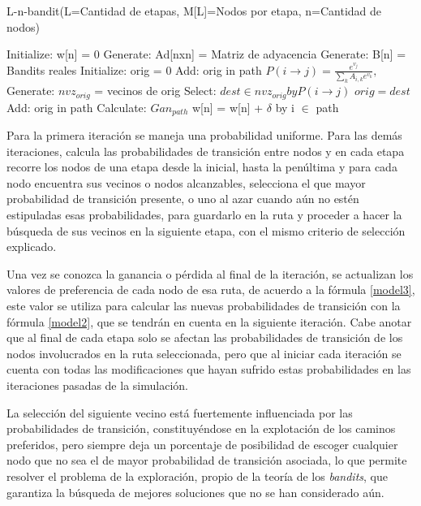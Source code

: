 \begin{algorithm}
\caption{L-n-bandit(L=Cantidad de etapas, M[L]=Nodos por etapa, n=Cantidad de nodos)} 
\label{Pseudo}
\begin{algorithmic}[1]
\STATE Initialize: w[n] = 0
\STATE Generate: Ad[nxn] = Matriz de adyacencia
\STATE Generate: B[n] = Bandits reales
     \STATE Initialize: orig = 0
     \STATE Add: orig in path
     \STATE $P(i \to j) = \frac{e^{v_j}}{\sum_k A_{i,k} e^{v_k}},$
        \STATE Generate: $nvz_{orig}$ = vecinos de orig
        \STATE Select: ${dest \in nvz_{orig} by P(i \to j)}$
        \STATE $orig = dest$
        \STATE Add: orig in path
     \ENDFOR
     \STATE Calculate: $Gan_{path}$
        \STATE w[n] = w[n] + $\delta$ by i $\in$ path
     \ENDIF    
\ENDFOR
\end{algorithmic}
\end{algorithm}

Para la primera iteración se maneja una probabilidad uniforme. Para las demás iteraciones, calcula las probabilidades de transición entre nodos y en cada etapa recorre los nodos de una etapa desde la inicial, hasta la penúltima y para cada nodo encuentra sus vecinos o nodos alcanzables, selecciona el que mayor probabilidad de transición presente, o uno al azar cuando aún no estén estipuladas esas probabilidades, para guardarlo en la ruta y proceder a hacer la búsqueda de sus vecinos en la siguiente etapa, con el mismo criterio de selección explicado.

Una vez se conozca la ganancia o pérdida al final de la iteración, se actualizan los valores de preferencia de cada nodo de esa ruta, de acuerdo a la fórmula \ref{model3}, este valor se utiliza para calcular las nuevas probabilidades de transición con la fórmula \ref{model2}, que se tendrán en cuenta en la siguiente iteración. Cabe anotar que al final de cada etapa solo se afectan las probabilidades de transición de los nodos involucrados en la ruta seleccionada, pero que al iniciar cada iteración se cuenta con todas las modificaciones que hayan sufrido estas probabilidades en las iteraciones pasadas de la simulación.

La selección del siguiente vecino está fuertemente influenciada por las probabilidades de transición, constituyéndose en la explotación de los caminos preferidos, pero siempre deja un porcentaje de posibilidad de escoger cualquier nodo que no sea el de mayor probabilidad de transición asociada, lo que permite resolver el problema de la exploración, propio de la teoría de los \textit{bandits}, que garantiza la búsqueda de mejores soluciones que no se han considerado aún.

